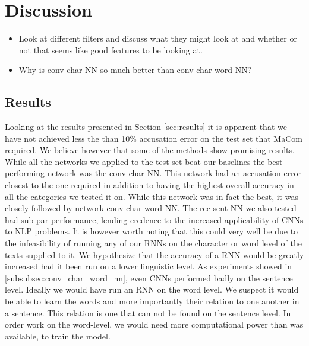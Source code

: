 \section{Discussion} \label{sec:discussion}

\begin{itemize}

    \item

        Look at different filters and discuss what they might look at and
        whether or not that seems like good features to be looking at.

    \item

        Why is conv-char-NN so much better than conv-char-word-NN?

\end{itemize}


\subsection{Results}

Looking at the results presented in Section \ref{sec:results} it is apparent
that we have not achieved less the than 10\% accusation error on the test
set that MaCom required. We believe however that some of the methods show
promising results. While all the networks we applied to the test set beat
our baselines the best performing network was the \gls{conv-char-NN}. This
network had an accusation error closest to the one required in addition to
having the highest overall accuracy in all the categories we tested it on.
While this network was in fact the best, it was closely followed by network
\gls{conv-char-word-NN}. The \gls{rec-sent-NN} we also tested had sub-par
performance, lending credence to the increased applicability of \glspl{CNN} to
\gls{NLP} problems. It is however worth noting that this could very well be
due to the infeasibility of running any of our \glspl{RNN} on the character or
word level of the texts supplied to it. We hypothesize that the accuracy of a
RNN would be greatly increased had it been run on a lower linguistic level.
As experiments showed in \ref{subsubsec:conv_char_word_nn}, even \gls{CNN}s
performed badly on the sentence level. Ideally we would have run an RNN on the
word level. We suspect it would be able to learn the words and more importantly
their relation to one another in a sentence. This relation is one that can not
be found on the sentence level. In order work on the word-level, we would need
more computational power than was available, to train the model.

